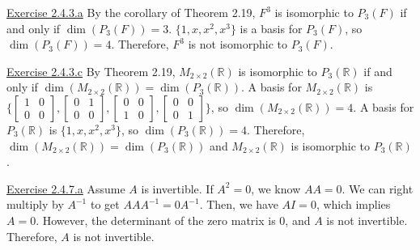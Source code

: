\documentclass{exam}
\begin{document}
\underline{Exercise 2.4.3.a}
\newline
\newline
By the corollary of Theorem 2.19, $F^3$ is isomorphic to $P_3(F)$ if and only if $\dim(P_3(F))=3$. $\{1,x,x^2,x^3\}$ is a basis for $P_3(F)$, so $\dim(P_3(F))=4$. Therefore, $F^3$ is not isomorphic to $P_3(F)$.
\newline

\underline{Exercise 2.4.3.c}
\newline
\newline
By Theorem 2.19, $M_{2\times2}(\mathbb{R})$ is isomorphic to $P_3(\mathbb{R})$ if and only if $\dim(M_{2\times2}(\mathbb{R}))=\dim(P_3(\mathbb{R}))$. A basis for $M_{2\times2}(\mathbb{R})$ is $\{
    \begin{bmatrix}
        1 & 0 \\
        0 & 0
    \end{bmatrix}
    ,
    \begin{bmatrix}
        0 & 1 \\
        0 & 0
    \end{bmatrix}
    ,
    \begin{bmatrix}
        0 & 0 \\
        1 & 0
    \end{bmatrix}
    ,
    \begin{bmatrix}
        0 & 0 \\
        0 & 1
    \end{bmatrix}
\}$, so $\dim(M_{2\times2}(\mathbb{R}))=4$. A basis for $P_3(\mathbb{R})$ is $\{1,x,x^2,x^3\}$, so $\dim(P_3(\mathbb{R}))=4$. Therefore, $\dim(M_{2\times2}(\mathbb{R}))=\dim(P_3(\mathbb{R}))$ and $M_{2\times2}(\mathbb{R})$ is isomorphic to $P_3(\mathbb{R})$.
\newline

\underline{Exercise 2.4.7.a}
\newline
\newline
Assume $A$ is invertible. If $A^2=0$, we know $AA=0$. We can right multiply by $A^{-1}$ to get $AAA^{-1}=0A^{-1}$. Then, we have $AI=0$, which implies $A=0$. However, the determinant of the zero matrix is 0, and $A$ is not invertible. Therefore, $A$ is not invertible.
\end{document}
